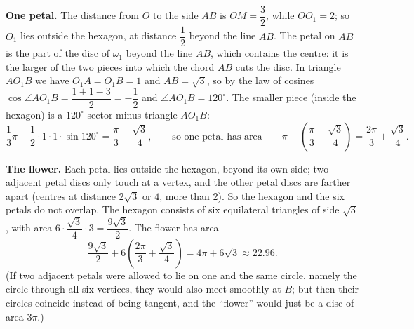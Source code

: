 \textbf{One petal.} The distance from $O$ to the side $AB$ is $OM=\dfrac32$, while $OO_1=2$; so $O_1$ lies outside the hexagon, at distance $\dfrac12$ beyond the line $AB$. The petal on $AB$ is the part of the disc of $\omega_1$ beyond the line $AB$, which contains the centre: it is the larger of the two pieces into which the chord $AB$ cuts the disc. In triangle $AO_1B$ we have $O_1A=O_1B=1$ and $AB=\sqrt3$, so by the law of cosines $\cos\angle AO_1B=\dfrac{1+1-3}{2}=-\dfrac12$ and $\angle AO_1B=120^\circ$. The smaller piece (inside the hexagon) is a $120^\circ$ sector minus triangle $AO_1B$:
\[\dfrac13\pi-\dfrac12\cdot1\cdot1\cdot\sin120^\circ=\dfrac\pi3-\dfrac{\sqrt3}{4},\qquad\text{so one petal has area}\qquad\pi-\left(\dfrac\pi3-\dfrac{\sqrt3}{4}\right)=\dfrac{2\pi}{3}+\dfrac{\sqrt3}{4}.\]

\textbf{The flower.} Each petal lies outside the hexagon, beyond its own side; two adjacent petal discs only touch at a vertex, and the other petal discs are farther apart (centres at distance $2\sqrt3$ or $4$, more than $2$). So the hexagon and the six petals do not overlap. The hexagon consists of six equilateral triangles of side $\sqrt3$, with area $6\cdot\dfrac{\sqrt3}{4}\cdot3=\dfrac{9\sqrt3}{2}$. The flower has area
\[\dfrac{9\sqrt3}{2}+6\left(\dfrac{2\pi}{3}+\dfrac{\sqrt3}{4}\right)=\boxed{4\pi+6\sqrt3}\approx22.96.\]
(If two adjacent petals were allowed to lie on one and the same circle, namely the circle through all six vertices, they would also meet smoothly at $B$; but then their circles coincide instead of being tangent, and the ``flower'' would just be a disc of area $3\pi$.)
